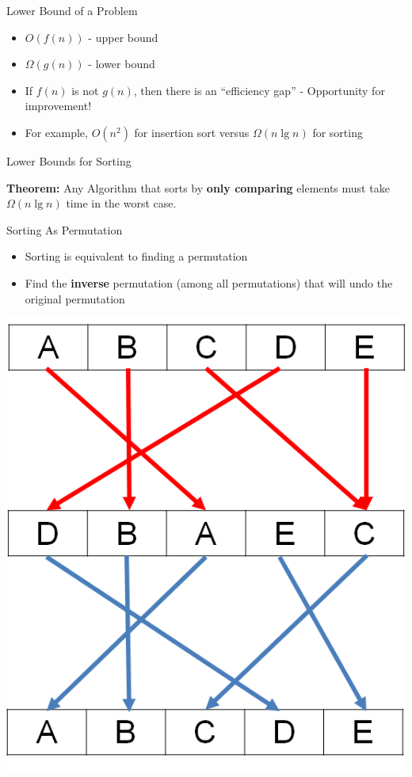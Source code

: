 \documentclass{beamer}
\begin{document}
\begin{frame}{Lower Bound of a Problem}
\begin{itemize}
\item $O(f(n))$ - upper bound
\item $\Omega(g(n))$ - lower bound
\item If $f(n)$ is not $g(n)$, then there is an ``efficiency gap'' - Opportunity for improvement!
\item For example, $O(n^2)$ for insertion sort versus $\Omega(n \lg n)$ for sorting
\end{itemize}
\end{frame}


\begin{frame}{Lower Bounds for Sorting}

{\bf Theorem:} Any Algorithm that sorts by {\bf only comparing} elements must take $\Omega(n \lg n)$ time in the worst case.
\end{frame}

\begin{frame}{Sorting As Permutation}
\begin{itemize}
\item Sorting is equivalent to finding a permutation 
\item Find the {\bf inverse} permutation (among all permutations) that will undo the original permutation
\end{itemize}
\begin{center}
    \includegraphics[scale=0.3]{sortingAsPermutation.png}
\end{center}
\end{frame}
\end{document}
